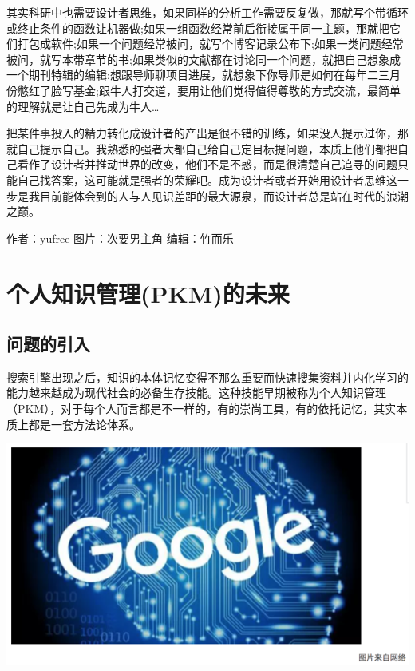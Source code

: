 \documentclass[
]{book}
\begin{document}
其实科研中也需要设计者思维，如果同样的分析工作需要反复做，那就写个带循环或终止条件的函数让机器做;如果一组函数经常前后衔接属于同一主题，那就把它们打包成软件;如果一个问题经常被问，就写个博客记录公布下;如果一类问题经常被问，就写本带章节的书;如果类似的文献都在讨论同一个问题，就把自己想象成一个期刊特辑的编辑;想跟导师聊项目进展，就想象下你导师是如何在每年二三月份憋红了脸写基金;跟牛人打交道，要用让他们觉得值得尊敬的方式交流，最简单的理解就是让自己先成为牛人\ldots{}

把某件事投入的精力转化成设计者的产出是很不错的训练，如果没人提示过你，那就自己提示自己。我熟悉的强者大都自己给自己定目标提问题，本质上他们都把自己看作了设计者并推动世界的改变，他们不是不惑，而是很清楚自己追寻的问题只能自己找答案，这可能就是强者的荣耀吧。成为设计者或者开始用设计者思维这一步是我目前能体会到的人与人见识差距的最大源泉，而设计者总是站在时代的浪潮之巅。

作者：yufree
图片：次要男主角
编辑：竹而乐

\hypertarget{ux4e2aux4ebaux77e5ux8bc6ux7ba1ux7406pkmux7684ux672aux6765}{%
\section{个人知识管理(PKM)的未来}\label{ux4e2aux4ebaux77e5ux8bc6ux7ba1ux7406pkmux7684ux672aux6765}}

\hypertarget{ux95eeux9898ux7684ux5f15ux5165}{%
\subsection{问题的引入}\label{ux95eeux9898ux7684ux5f15ux5165}}

搜索引擎出现之后，知识的本体记忆变得不那么重要而快速搜集资料并内化学习的能力越来越成为现代社会的必备生存技能。这种技能早期被称为个人知识管理（PKM），对于每个人而言都是不一样的，有的崇尚工具，有的依托记忆，其实本质上都是一套方法论体系。

\includegraphics[width=8.33in]{images/gtd1}
\end{document}
